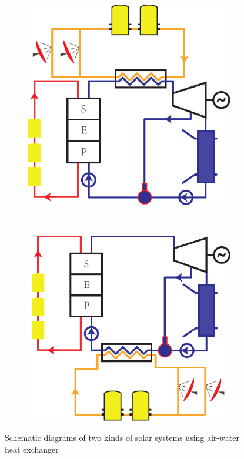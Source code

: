 \noindent \begin{figure}[htbp]
\centering
	\begin{subfigure}[b]{0.4\columnwidth}
	\includegraphics[width = \columnwidth]{fig/air-water1}
	\caption{}\label{fig:air-water_1}
	\end{subfigure}
	~
\begin{subfigure}[b]{0.4\columnwidth}
	\includegraphics[width = \columnwidth]{fig/air-water2}
	\caption{}\label{fig:air-water_2}
	\end{subfigure}
	\caption{Schematic diagrams of two kinds of solar systems using air-water heat exchanger}
	\label{fig:air-water}
\end{figure}

